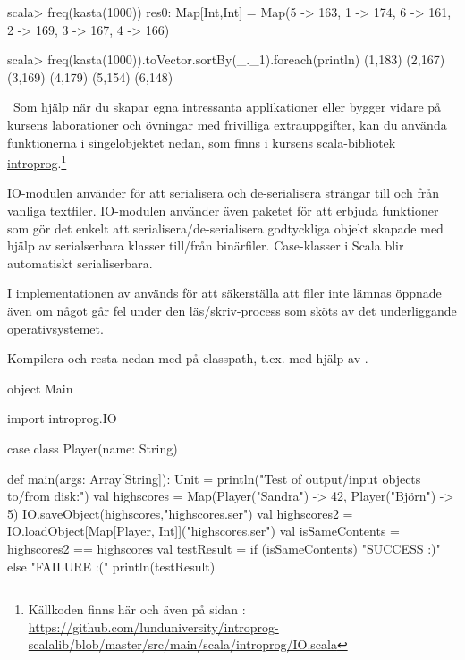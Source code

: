 \begin{REPL}
scala> freq(kasta(1000))
res0: Map[Int,Int] = Map(5 -> 163, 1 -> 174, 6 -> 161, 2 -> 169, 3 -> 167, 4 -> 166)

scala> freq(kasta(1000)).toVector.sortBy(_._1).foreach(println)
(1,183)
(2,167)
(3,169)
(4,179)
(5,154)
(6,148)
\end{REPL}

\QUESTEND






\QUESTBEGIN

\Task \what~Som hjälp när du skapar egna intressanta applikationer eller bygger vidare på kursens laborationer och övningar med frivilliga extrauppgifter, kan du använda funktionerna i singelobjektet  nedan, som finns i kursens scala-bibliotek \href{http://cs.lth.se/pgk/api}{introprog}.\footnote{Källkoden finns här och även på sidan \pageref{disk-access-code}:\\ \href{https://github.com/lunduniversity/introprog/blob/master/compendium/workspace/introprog/src/main/scala/introprog/IO.scala}{https://github.com/lunduniversity/introprog-scalalib/blob/master/src/main/scala/introprog/IO.scala}}

IO-modulen använder  för att serialisera och de-serialisera strängar till och från vanliga textfiler. IO-modulen använder även paketet  för att erbjuda funktioner som gör det enkelt att serialisera/de-serialisera godtyckliga objekt skapade med hjälp av serialserbara klasser till/från binärfiler. Case-klasser i Scala blir automatiskt serialiserbara.

I implementationen av  används  för att säkerställa att filer inte lämnas öppnade även om något går fel under den läs/skriv-process som sköts av det underliggande operativsystemet.

\Subtask
Kompilera och resta nedan med  på classpath, t.ex. med hjälp av .
\begin{Code}
object Main {
  import introprog.IO

  case class Player(name: String)

  def main(args: Array[String]): Unit = {
    println("Test of output/input objects to/from disk:")
    val highscores = Map(Player("Sandra") -> 42, Player("Björn") -> 5)
    IO.saveObject(highscores,"highscores.ser")
    val highscores2 = IO.loadObject[Map[Player, Int]]("highscores.ser")
    val isSameContents = highscores2 == highscores
    val testResult = if (isSameContents) "SUCCESS :)" else "FAILURE :("
    println(testResult)
  }

}
\end{Code}

